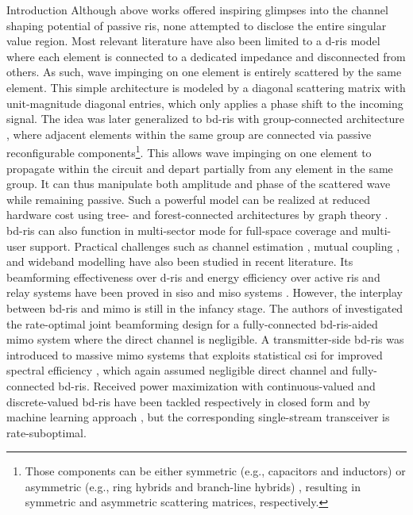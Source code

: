 \documentclass[journal]{IEEEtran}
\begin{document}
\begin{section}{Introduction}
		Although above works offered inspiring glimpses into the channel shaping potential of passive \gls{ris}, none attempted to disclose the entire singular value region.
		Most relevant literature \cite{ElMossallamy2021,Meng2023,Zheng2022,Huang2023,Bafghi2022,Zheng2023,Chae2023,Wu2019,Santamaria2023a} have also been limited to a \gls{d}-\gls{ris} model where each element is connected to a dedicated impedance and disconnected from others.
		As such, wave impinging on one element is entirely scattered by the same element.
		This simple architecture is modeled by a diagonal scattering matrix with unit-magnitude diagonal entries, which only applies a phase shift to the incoming signal.
		The idea was later generalized to \gls{bd}-\gls{ris} with group-connected architecture \cite{Shen2020a}, where adjacent elements within the same group are connected via passive reconfigurable components\footnote{Those components can be either symmetric (e.g., capacitors and inductors) or asymmetric (e.g., ring hybrids and branch-line hybrids) \cite{Ahn2006}, resulting in symmetric and asymmetric scattering matrices, respectively.}.
		This allows wave impinging on one element to propagate within the circuit and depart partially from any element in the same group.
		It can thus manipulate both amplitude and phase of the scattered wave while remaining passive.
		Such a powerful model can be realized at reduced hardware cost using tree- and forest-connected architectures by graph theory \cite{Nerini2024}.
		\gls{bd}-\gls{ris} can also function in
		multi-sector mode \cite{Li2023c} for full-space coverage and multi-user support.
		Practical challenges such as channel estimation \cite{Li2024}, mutual coupling \cite{Li2023f}, and wideband modelling \cite{Li2024a} have also been studied in recent literature.
		Its beamforming effectiveness over \gls{d}-\gls{ris} and energy efficiency over active \gls{ris} and relay systems have been proved in \gls{siso} and \gls{miso} systems \cite{Shen2020a,Nerini2023,Nerini2024,Santamaria2023,Fang2023,Zhou2023,Li2023c,Soleymani2024}.
		However, the interplay between \gls{bd}-\gls{ris} and \gls{mimo} is still in the infancy stage.
		The authors of \cite{Bartoli2023} investigated the rate-optimal joint beamforming design for a fully-connected \gls{bd}-\gls{ris}-aided \gls{mimo} system where the direct channel is negligible.
		A transmitter-side \gls{bd}-\gls{ris} was introduced to
		massive \gls{mimo} systems that exploits statistical \gls{csi} for improved spectral efficiency \cite{Mishra2024}, which again assumed negligible direct channel and fully-connected \gls{bd}-\gls{ris}.
		Received power maximization with continuous-valued and discrete-valued \gls{bd}-\gls{ris} have been tackled respectively in closed form \cite{Nerini2023} and by machine learning approach \cite{Nerini2023b}, but the corresponding single-stream transceiver is rate-suboptimal.


\end{section}
\end{document}
